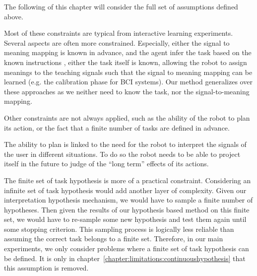 
\transition

The following of this chapter will consider the full set of assumptions defined above.

Most of these constraints are typical from interactive learning experiments. Several aspects are often more constrained. Especially, either the signal to meaning mapping is known in advance, and the agent infer the task based on the known instructions \cite{kaplan2002robotic,chernova09jair,knox2009interactively}, either the task itself is known, allowing the robot to assign meanings to the teaching signals such that the signal to meaning mapping can be learned (e.g. the calibration phase for BCI systems). Our method generalizes over these approaches as we neither need to know the task, nor the signal-to-meaning mapping.

Other constraints are not always applied, such as the ability of the robot to plan its action, or the fact that a finite number of tasks are defined in advance.

The ability to plan is linked to the need for the robot to interpret the signals of the user in different situations. To do so the robot needs to be able to project itself in the future to judge of the ``long term'' effects of its actions. 


The finite set of task hypothesis is more of a practical constraint. Considering an infinite set of task hypothesis would add another layer of complexity. Given our interpretation hypothesis mechanism, we would have to sample a finite number of hypotheses. Then given the results of our hypothesis based method on this finite set, we would have to re-sample some new hypothesis and test them again until some stopping criterion. This sampling process is logically less reliable than assuming the correct task belongs to a finite set. Therefore, in our main experiments, we only consider problems where a finite set of task hypothesis can be defined. It is only in chapter~\ref{chapter:limitations:continuoushypothesis} that this assumption is removed.

